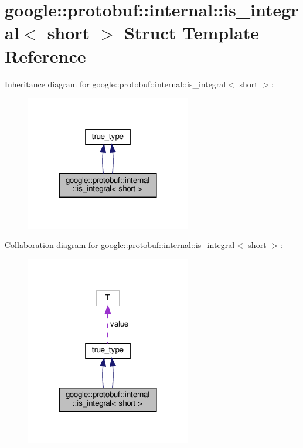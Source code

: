 \hypertarget{structgoogle_1_1protobuf_1_1internal_1_1is__integral_3_01short_01_4}{}\section{google\+:\+:protobuf\+:\+:internal\+:\+:is\+\_\+integral$<$ short $>$ Struct Template Reference}
\label{structgoogle_1_1protobuf_1_1internal_1_1is__integral_3_01short_01_4}


Inheritance diagram for google\+:\+:protobuf\+:\+:internal\+:\+:is\+\_\+integral$<$ short $>$\+:
\nopagebreak
\begin{figure}[H]
\begin{center}
\leavevmode
\includegraphics[width=204pt]{structgoogle_1_1protobuf_1_1internal_1_1is__integral_3_01short_01_4__inherit__graph}
\end{center}
\end{figure}


Collaboration diagram for google\+:\+:protobuf\+:\+:internal\+:\+:is\+\_\+integral$<$ short $>$\+:
\nopagebreak
\begin{figure}[H]
\begin{center}
\leavevmode
\includegraphics[width=204pt]{structgoogle_1_1protobuf_1_1internal_1_1is__integral_3_01short_01_4__coll__graph}
\end{center}
\end{figure}
